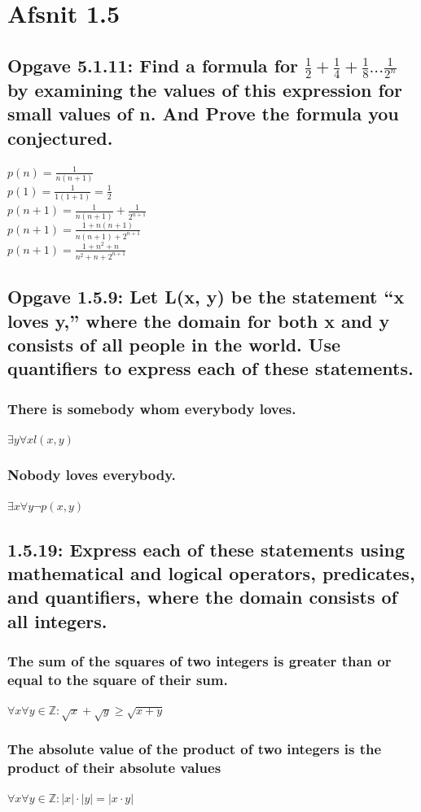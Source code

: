 \documentclass[12pt, a4paper]{report}
\begin{document}
		\section{Afsnit 1.5}
			\setcounter{subsection}{10}
			\subsection{Opgave 5.1.11: Find a formula for $\frac{1}{2}+\frac{1}{4}+\frac{1}{8}...\frac{1}{2^n}$ by examining the values of this expression for small values of n. And Prove the formula you conjectured.}
				$p(n)=\frac{1}{n(n+1)}$\\
				$p(1)=\frac{1}{1(1+1)}=\frac{1}{2}$\\
				$p(n+1)=\frac{1}{n(n+1)}+\frac{1}{2^{n+1}}$\\
				$p(n+1)=\frac{1+n(n+1)}{n(n+1)+2^{n+1}}$\\
				$p(n+1)=\frac{1+n^2+n}{n^2+n+2^{n+1}}$
			\setcounter{subsection}{8}
			\subsection{Opgave 1.5.9: Let L(x, y) be the statement “x loves y,” where the domain for both x and y consists of all people in the world. Use quantiﬁers to express each of these statements.}
				\subsubsection{There is somebody whom everybody loves.}
					$\exists y \forall x l(x,y)$
				\subsubsection{Nobody loves everybody.}
					$\exists x \forall y\neg p(x,y)$
			\setcounter{subsection}{18}

			\subsection{1.5.19: Express each of these statements using mathematical and logical operators, predicates, and quantiﬁers, where the domain consists of all integers.}
				\subsubsection{The sum of the squares of two integers is greater than or equal to the square of their sum.}
					$\forall x \forall y \in \mathbb{Z}: \sqrt{x}+\sqrt{y}\geq \sqrt{x+y}$
				\subsubsection{The absolute value of the product of two integers is the product of their absolute values}
					$\forall x \forall y \in \mathbb{Z}: |x|\cdot |y|=|x\cdot y|$
			\setcounter{subsection}{26}
\end{document}
